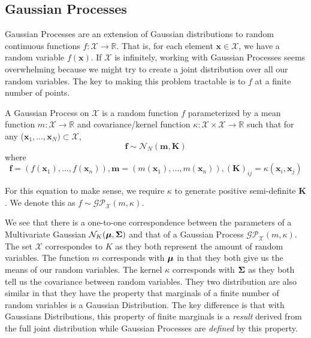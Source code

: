 \subsection{Gaussian Processes}

Gaussian Processes are an extension of Gaussian distributions to random continuous functions $f: \mathcal{X} \to \mathbb{R}$.
That is, for each element $\mathbf{x} \in \mathcal{X}$, we have a random variable $f(\mathbf{x})$.
If $\mathcal{X}$ is infinitely, working with Gaussian Processes seems overwhelming because we might try to create a joint distribution over all our random variables.
The key to making this problem tractable is to $f$ at a finite number of points.

\begin{definition}\label{def:gp}
    A Gaussian Process on $\mathcal{X}$ is a random function $f$ parameterized by a mean function
    $m: \mathcal{X} \to \mathbb{R}$ and covariance/kernel function $\kappa: \mathcal{X} \times \mathcal{X} \to \mathbb{R}$
    such that
    for any ($\mathbf{x}_1, \dots,\mathbf{x}_N) \subset \mathcal{X}$,
    \begin{equation*}
        \mathbf{f} \sim \mathcal{N}_N\left(\mathbf{m}, \mathbf{K}\right)
    \end{equation*}
    where
    \begin{equation*}
        \mathbf{f} = (f(\mathbf{x}_1), \dots, f(\mathbf{x}_n)), \mathbf{m} = (m(\mathbf{x}_1), \dots, m(\mathbf{x}_n)), (\mathbf{K})_{ij} = \kappa(\mathbf{x}_i, \mathbf{x}_j)
    \end{equation*}

    For this equation to make sense, we require $\kappa$ to generate positive semi-definite $\mathbf{K}$.
    We denote this as $f \sim \mathcal{GP}_{\mathcal{X}}(m, \kappa)$.
\end{definition}

We see that there is a one-to-one correspondence between the parameters of a Multivariate Gaussian $\mathcal{N}_{K}(\boldsymbol{\mu}, \boldsymbol{\Sigma})$ and that of a Gaussian Process $\mathcal{GP}_{ \mathcal{X}}(m, \kappa)$.
The set $\mathcal{X}$ correspondes to $K$ as they both represent the amount of random variables.
The function $m$ corresponds with $\boldsymbol{\mu}$ in that they both give us the means of our random variables.
The kernel $\kappa$ corresponds with $\boldsymbol{\Sigma}$ as they both tell us the covariance between random variables.
They two distribution are also similar in that they have the property that marginals of a finite number of random variables is a Gaussian Distribution.
The key difference is that with Gaussians Distributions, this property of finite marginals is a \emph{result} derived from the full joint distribution while Gaussian Processes are \emph{defined} by this property.

